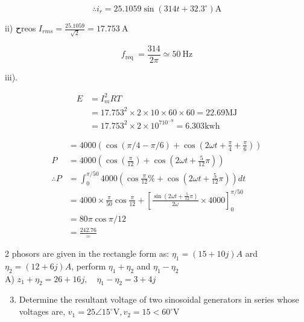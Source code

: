 \documentclass[12pt, a4paper]{article}
\begin{document}
	$$
		\therefore i_{r}=25.1059 \sin \left(314 t+32.3^{\circ}\right) \mathrm{A}
	$$

	ii) حreos $I_{r m s}=\frac{25.1059}{\sqrt{2}}=17.753 \mathrm{~A}$

	$$
		f_{\text {req }}=\frac{314}{2 \pi} \simeq 50 \mathrm{~Hz}
	$$

	iii).

	$$
		\begin{aligned}
			E & =I_{m}^{2} R T                                                       \\
			  & =17.753^{2} \times 2 \times 10 \times 60 \times 60=22.69 \mathrm{MJ} \\
			  & =17.753^{2} \times 2 \times 10^{710^{-9}}=6.303 \mathrm{kwh}
		\end{aligned}
	$$

	$$
		\begin{aligned}
			             & =4000\left(\cos (\pi / 4-\pi / 6)+\cos \left(2 \omega t+\frac{\pi}{4}+\frac{\pi}{6}\right)\right)                                                      \\
			P            & =4000\left(\cos \left(\frac{\pi}{12}\right)+\cos \left(2 \omega t+\frac{5}{12} \pi\right)\right)                                                       \\
			\therefore P & =\int_{0}^{\pi / 50} 4000\left(\cos \frac{\pi}{12} \%+\cos \left(2 \omega t+\frac{5}{12} \pi\right)\right) d t                                         \\
			             & =4000 \times \frac{\pi}{50} \cos \frac{\pi}{12}+\left[\frac{\sin \left(2 \omega t+\frac{5}{12} \pi\right)}{2 \omega} \times 4000\right]_{0}^{\pi / 50} \\
			             & =80 \pi \cos \pi / 12                                                                                                                                  \\
			             & =\frac{242.76}{=}
		\end{aligned}
	$$

	2 phosors are given in the rectangle form as: $\eta_{1}=(15+10 j) A$ ard $\eta_{2}=(12+6 j) A$, perform $\eta_{1}+\eta_{2}$ and $\eta_{1}-\eta_{2}$\\
	A) $z_{1}+\eta_{2}=26+16 j, \quad \eta_{1}-\eta_{2}=3+4 j$

	\begin{enumerate}
		\setcounter{enumi}{2}
		\item Determine the resultant voltage of two sinosoidal generators in series whose voltages are, $v_{1}=25 \angle 15^{\circ} \mathrm{V}, v_{2}=15<60^{\circ} \mathrm{V}$
	\end{enumerate}
\end{document}
